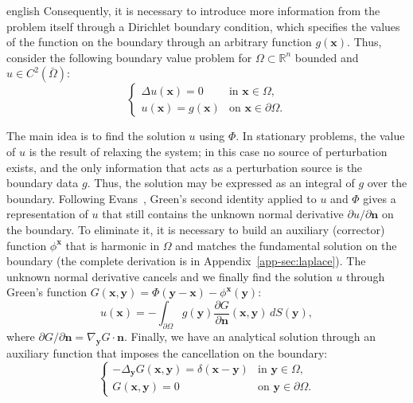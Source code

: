 \documentclass[12pt,letterpaper,twoside]{book}
\begin{document}
\begin{hyphenrules}{english}
Consequently, it is necessary to introduce more information from the problem itself through a
Dirichlet boundary condition, which specifies the values of the function on the boundary through an
arbitrary function $g(\mathbf{x})$. Thus, consider the following boundary value problem for
$\Omega\subset\mathbb{R}^n$ bounded and $u\in C^2(\bar\Omega)$:
\begin{equation}
  \begin{cases}
    \Delta u(\mathbf{x})=0 & \text{in } \mathbf{x}\in\Omega,\\
    u(\mathbf{x})=g(\mathbf{x}) & \text{on } \mathbf{x}\in\partial\Omega.
  \end{cases}
  \label{eq:laplace-dirichlet}
\end{equation}

The main idea is to find the solution $u$ using $\Phi$. In stationary problems, the value of $u$ is the
result of relaxing the system; in this case no source of perturbation exists, and the only information
that acts as a perturbation source is the boundary data $g$. Thus, the solution may be expressed as an
integral of $g$ over the boundary. Following Evans~\cite{evans2010}, Green's second identity applied to
$u$ and $\Phi$ gives a representation of $u$ that still contains the unknown normal derivative
$\partial u/\partial\mathbf{n}$ on the boundary. To eliminate it, it is necessary to build an auxiliary
(corrector) function $\phi^{\mathbf{x}}$ that is harmonic in $\Omega$ and matches the fundamental solution on
the boundary (the complete derivation is in Appendix~\ref{app-sec:laplace}). The unknown normal derivative
cancels and we finally find the solution $u$ through Green's function
$G(\mathbf{x},\mathbf{y})=\Phi(\mathbf{y}-\mathbf{x})-\phi^{\mathbf{x}}(\mathbf{y})$:
\begin{equation}
  u(\mathbf{x})=-\int_{\partial\Omega}g(\mathbf{y})\frac{\partial G}{\partial\mathbf{n}}(\mathbf{x},\mathbf{y})\,d S(\mathbf{y}),
  \label{eq:laplace-green}
\end{equation}
where $\partial G/\partial\mathbf{n}=\nabla_{\mathbf{y}}G\cdot\mathbf{n}$. Finally, we have an analytical solution through an
auxiliary function that imposes the cancellation on the boundary:
\begin{equation}
  \begin{cases}
    -\Delta_{\mathbf{y}}G(\mathbf{x},\mathbf{y})=\delta(\mathbf{x}-\mathbf{y}) & \text{in } \mathbf{y}\in\Omega,\\
    G(\mathbf{x},\mathbf{y})=0 & \text{on } \mathbf{y}\in\partial\Omega.
  \end{cases}
  \label{eq:green-function}
\end{equation}


\end{hyphenrules}
\end{document}
